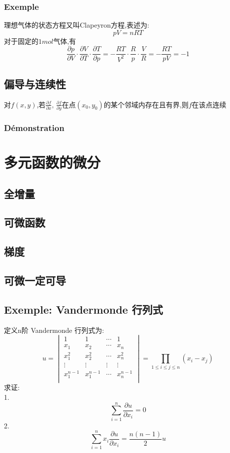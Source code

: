 \documentclass[12pt, a4paper, oneside]{ctexbook}
\begin{document}
  \subsubsection{Exemple}
  理想气体的状态方程又叫Clapeyron方程,表述为:
  $$
  pV=nRT
  $$
  对于固定的$1mol$气体,有
  $$
  \frac{\partial p}{\partial V}\cdot\frac{\partial V}{\partial T}\cdot\frac{\partial T}{\partial p}=-\frac{RT}{V^2}\cdot\frac{R}{p}\cdot\frac{V}{R}=-\frac{RT}{pV}=-1
  $$
  \subsection{偏导与连续性}
  对$f(x,y)$,若$\frac{\partial f}{\partial x},\, \frac{\partial f}{\partial y}$在点$(x_0,y_0)$的某个邻域内存在且有界,则$f$在该点连续
  \subsubsection{Démonstration}


  \section{多元函数的微分}
  \subsection{全增量}
  \subsection{可微函数}
  \subsection{梯度}
  \subsection{可微一定可导}

  \subsection{Exemple: Vandermonde 行列式}
    定义n阶 Vandermonde 行列式为:
    $$
    u=\begin{vmatrix}
      1 &1   &\cdots & 1 \\
      x_1 &x_2 & \cdots & x_n  \\
      x_1^2 &x_2^2 & \cdots & x_n^2  \\
      \vdots &\vdots & \vdots & \vdots   \\
      x_1^{n-1} & x_1^{n-1} &\cdots &x_n^{n-1} \\
      \end{vmatrix}
      =\prod _{1\leq i\leq j\leq n}(x_i-x_j)
    $$
    求证:\\
    1.
    $$
      \sum_{i = 1}^{n}  \frac{\partial u}{\partial x_i}=0
    $$
    2.
    $$
    \sum_{i = 1}^{n}  x_i \frac{\partial u}{\partial x_i}=\frac{n(n-1)}{2}u
    $$
\end{document}

